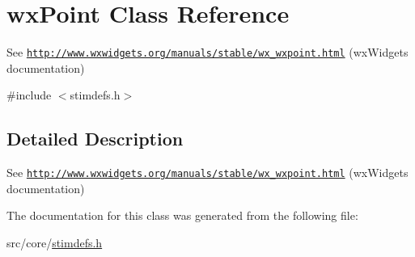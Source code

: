 \hypertarget{classwxPoint}{
\section{wxPoint Class Reference}
\label{classwxPoint}
}


See \href{http://www.wxwidgets.org/manuals/stable/wx_wxpoint.html}{\tt http://www.wxwidgets.org/manuals/stable/wx\_\-wxpoint.html} (wxWidgets documentation)  




{\ttfamily \#include $<$stimdefs.h$>$}



\subsection{Detailed Description}
See \href{http://www.wxwidgets.org/manuals/stable/wx_wxpoint.html}{\tt http://www.wxwidgets.org/manuals/stable/wx\_\-wxpoint.html} (wxWidgets documentation) 

The documentation for this class was generated from the following file:\begin{DoxyCompactItemize}
\item 
src/core/\hyperlink{stimdefs_8h}{stimdefs.h}\end{DoxyCompactItemize}
